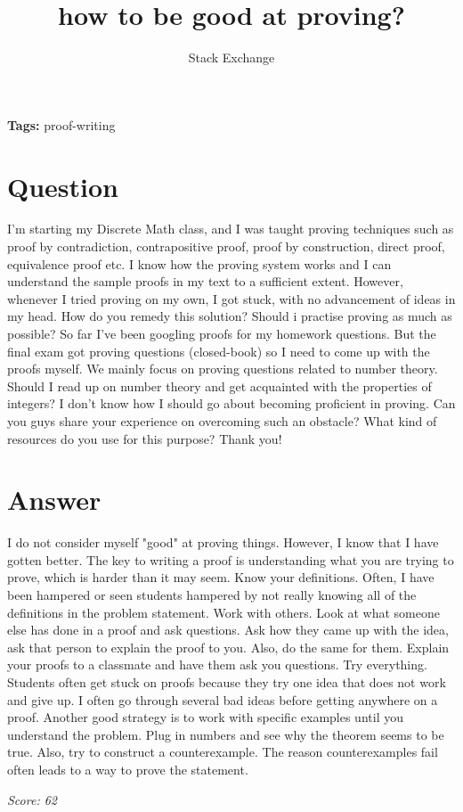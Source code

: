 \documentclass{article}
\title{how to be good at proving?}
\author{Stack Exchange}
\date{}
\begin{document}
\maketitle

\noindent\textbf{Tags:} proof-writing

\section*{Question}
I'm starting my Discrete Math class, and I was taught proving techniques such as proof by contradiction, contrapositive proof, proof by construction, direct proof, equivalence proof etc. I know how the proving system works and I can understand the sample proofs in my text to a sufficient extent. However, whenever I tried proving on my own, I got stuck, with no advancement of ideas in my head. How do you remedy this solution? Should i practise proving as much as possible? So far I've been googling proofs for my homework questions. But the final exam got proving questions (closed-book) so I need to come up with the proofs myself. We mainly focus on proving questions related to number theory. Should I read up on number theory and get acquainted with the properties of integers? I don't know how I should go about becoming proficient in proving. Can you guys share your experience on overcoming such an obstacle? What kind of resources do you use for this purpose? Thank you!

\section*{Answer}
I do not consider myself "good" at proving things. However, I know that I have gotten better. The key to writing a proof is understanding what you are trying to prove, which is harder than it may seem. Know your definitions. Often, I have been hampered or seen students hampered by not really knowing all of the definitions in the problem statement. Work with others. Look at what someone else has done in a proof and ask questions. Ask how they came up with the idea, ask that person to explain the proof to you. Also, do the same for them. Explain your proofs to a classmate and have them ask you questions. Try everything. Students often get stuck on proofs because they try one idea that does not work and give up. I often go through several bad ideas before getting anywhere on a proof. Another good strategy is to work with specific examples until you understand the problem. Plug in numbers and see why the theorem seems to be true. Also, try to construct a counterexample. The reason counterexamples fail often leads to a way to prove the statement.

\vspace{1em}
\noindent\textit{Score: 62}
\end{document}

